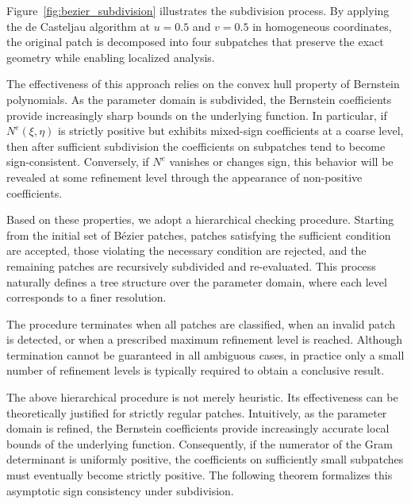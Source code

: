 \documentclass{jssc}
\begin{document}
Figure~\ref{fig:bezier_subdivision} illustrates the subdivision process. By applying the de Casteljau algorithm at $u=0.5$ and $v=0.5$ in homogeneous coordinates, the original patch is decomposed into four subpatches that preserve the exact geometry while enabling localized analysis.

The effectiveness of this approach relies on the convex hull property of Bernstein polynomials. As the parameter domain is subdivided, the Bernstein coefficients provide increasingly sharp bounds on the underlying function. In particular, if $N^e(\xi,\eta)$ is strictly positive but exhibits mixed-sign coefficients at a coarse level, then after sufficient subdivision the coefficients on subpatches tend to become sign-consistent. Conversely, if $N^e$ vanishes or changes sign, this behavior will be revealed at some refinement level through the appearance of non-positive coefficients.

Based on these properties, we adopt a hierarchical checking procedure. Starting from the initial set of B\'ezier patches, patches satisfying the sufficient condition are accepted, those violating the necessary condition are rejected, and the remaining patches are recursively subdivided and re-evaluated. This process naturally defines a tree structure over the parameter domain, where each level corresponds to a finer resolution.

The procedure terminates when all patches are classified, when an invalid patch is detected, or when a prescribed maximum refinement level is reached. Although termination cannot be guaranteed in all ambiguous cases, in practice only a small number of refinement levels is typically required to obtain a conclusive result.

The above hierarchical procedure is not merely heuristic. Its effectiveness can be theoretically justified for strictly regular patches. Intuitively, as the parameter domain is refined, the Bernstein coefficients provide increasingly accurate local bounds of the underlying function. Consequently, if the numerator of the Gram determinant is uniformly positive, the coefficients on sufficiently small subpatches must eventually become strictly positive. The following theorem formalizes this asymptotic sign consistency under subdivision.
\end{document}
